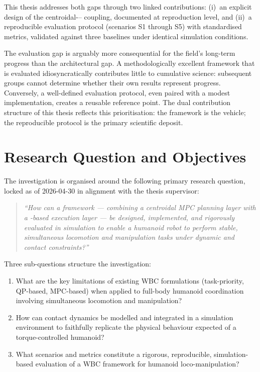 This thesis addresses both gaps through two linked contributions:
(i)~an explicit design of the centroidal---
coupling, documented at reproduction level, and (ii)~a reproducible
evaluation protocol (scenarios S1 through S5) with standardised
metrics, validated against three baselines under identical simulation
conditions.

\begin{criticalinsight}
  The evaluation gap is arguably more consequential for the field's
  long-term progress than the architectural gap. A methodologically
  excellent framework that is evaluated idiosyncratically contributes
  little to cumulative science: subsequent groups cannot determine
  whether their own results represent progress. Conversely, a
  well-defined evaluation protocol, even paired with a modest
  implementation, creates a reusable reference point. The dual
  contribution structure of this thesis reflects this prioritisation:
  the framework is the vehicle; the reproducible protocol is the
  primary scientific deposit.
\end{criticalinsight}


\section{Research Question and Objectives}
\label{sec:research-question}

The investigation is organised around the following primary research
question, locked as of 2026-04-30 in alignment with the thesis
supervisor:

\begin{quote}
  \textit{``How can a \WBC{} framework — combining a centroidal MPC
  planning layer with a \QP{}-based execution layer — be designed,
  implemented, and rigorously evaluated in simulation to enable a
  humanoid robot to perform stable, simultaneous locomotion and
  manipulation tasks under dynamic and contact constraints?''}
\end{quote}

\noindent Three sub-questions structure the investigation:

\begin{enumerate}[label=\textbf{SQ\arabic*}]
  \item What are the key limitations of existing WBC formulations
        (task-priority, QP-based, MPC-based) when applied to full-body
        humanoid coordination involving simultaneous locomotion and
        manipulation?
  \item How can contact dynamics be modelled and integrated in a
        simulation environment to faithfully replicate the physical
        behaviour expected of a torque-controlled humanoid?
  \item What scenarios and metrics constitute a rigorous, reproducible,
        simulation-based evaluation of a WBC framework for humanoid
        loco-manipulation?
\end{enumerate}

